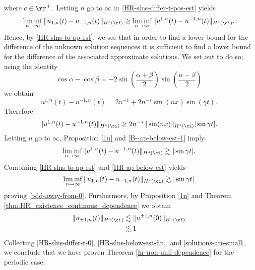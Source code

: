 where $c \in \rr^+$. Letting $n$ go to $\infty$ in
\eqref{HR-slns-differ-t-pos-est}
yields
%
\begin{equation} 
	\label{HR-slns-to-ap-est}
	\liminf_{n\to\infty}
	\|
	u_{1, n}(t)
	-
	u_{- 1, n}(t)
	\|_{H^s(\ci)}
	\ge
	\liminf_{n\to\infty}
	\|
	u^{1, n}(t)
	-
	u^{- 1, n}(t)
	\|_{H^s(\ci)}.
\end{equation}
%
%
Hence, by \eqref{HR-slns-to-ap-est}, we see that in order to find a lower bound for
the difference of the unknown solution sequences it is
sufficient to find a lower bound for the difference of the
associated approximate solutions. We set out to do so; using the identity 
$$
\cos \alpha -\cos \beta
=
-2
\sin(\frac{\alpha + \beta}{2})
\sin(\frac{\alpha - \beta}{2})
$$
we obtain
$$
u^{1, n}(t)
-
u^{- 1, n}(t)
=
2
n^{-1}
+
2
n^{-  s}
\sin (n x) \sin (\gamma t).
$$
Therefore
%
%
\begin{equation} 
	\label{B--ap-below-est-1}
	\|
	u^{1, n}(t)
	-
	u^{- 1, n}(t)
	\|_{H^s(\ci)}
	\ge
	2
	n^{  -  s}
	\|
	\sin (n x)
	\|_{H^s(\ci)}
	|\sin \gamma t|.
\end{equation}
%
%
Letting $n$ go to $\infty$, Proposition \ref{1n}
and \eqref{B--ap-below-est-1} imply
%
%
\begin{equation} 
	\label{HR-ap-below-est}
	\liminf_{n\to\infty}
	\|
	u^{1, n}(t)
	-
	u^{- 1, n}(t)
	\|_{H^s(\ci)}
	\gtrsim
	|\sin \gamma t|.
\end{equation}
%
%
Combining  \eqref{HR-slns-to-ap-est} and  \eqref{HR-ap-below-est}
yields
%
%
\begin{equation} 
	\label{HR-slns-below-est-fin}
	\liminf_{n\to\infty}
	\|
	u_{1, n}(t)
	-
	u_{- 1, n}(t)
	\|_{H^s(\ci)}
	\gtrsim
	|\sin \gamma t|
\end{equation}
%
%
proving \eqref{bdd-away-from-0}. Furthermore, by Proposition \ref{1n} and
Theorem \ref{thm:HR_existence_continous_dependence}  we obtain
\begin{equation}
	\begin{split}
		\label{solutions-are-small}
		\|u_{\pm 1, n} (t) \|_{H^{s}(\ci)}
		& \lesssim \|u^{\pm 1, n}(0) \|_{H^{s}(\ci)}
		\\
		& \lesssim 1
	\end{split}
\end{equation}
Collecting  \eqref{HR-slns-differ-t-0}, \eqref{HR-slns-below-est-fin}, and
\eqref{solutions-are-small}, we conclude that we have proven Theorem
\ref{hr-non-unif-dependence} for the periodic case.
%
%
%
%
%
%	
